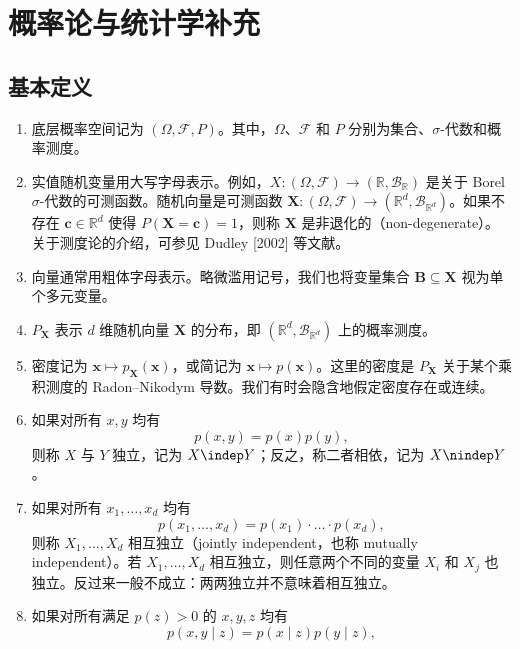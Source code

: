 \chapter{概率论与统计学补充}
\label{app:probability}
\section{基本定义}
\begin{enumerate}[label=(\roman*),leftmargin=2.7em]
\item 底层概率空间记为 $(\Omega,\mathcal F,P)$。其中，$\Omega$、$\mathcal F$ 和 $P$ 分别为集合、$\sigma$-代数和概率测度。
\item 实值随机变量用大写字母表示。例如，$X\colon(\Omega,\mathcal F)\to(\mathbb R,\mathcal B_{\mathbb R})$ 是关于 Borel $\sigma$-代数的可测函数。随机向量是可测函数 $\mathbf X\colon(\Omega,\mathcal F)\to(\mathbb R^d,\mathcal B_{\mathbb R^d})$。如果不存在 $\mathbf c\in\mathbb R^d$ 使得 $P(\mathbf X=\mathbf c)=1$，则称 $\mathbf X$ 是非退化的（non-degenerate）。关于测度论的介绍，可参见 Dudley [2002] 等文献。
\item 向量通常用粗体字母表示。略微滥用记号，我们也将变量集合 $\mathbf B\subseteq\mathbf X$ 视为单个多元变量。
\item $P_{\mathbf X}$ 表示 $d$ 维随机向量 $\mathbf X$ 的分布，即 $(\mathbb R^d,\mathcal B_{\mathbb R^d})$ 上的概率测度。
\item 密度记为 $\mathbf x\mapsto p_{\mathbf X}(\mathbf x)$，或简记为 $\mathbf x\mapsto p(\mathbf x)$。这里的密度是 $P_{\mathbf X}$ 关于某个乘积测度的 Radon--Nikodym 导数。我们有时会隐含地假定密度存在或连续。
\item 如果对所有 $x,y$ 均有
\begin{equation}p(x,y)=p(x)p(y),\tag{A.1}\end{equation}
则称 $X$ 与 $Y$ 独立，记为 $X\indep Y$；反之，称二者相依，记为 $X\nindep Y$。
\item 如果对所有 $x_1,\ldots,x_d$ 均有
\begin{equation}p(x_1,\ldots,x_d)=p(x_1)\cdot\ldots\cdot p(x_d),\tag{A.2}\end{equation}
则称 $X_1,\ldots,X_d$ 相互独立（jointly independent，也称 mutually independent）。若 $X_1,\ldots,X_d$ 相互独立，则任意两个不同的变量 $X_i$ 和 $X_j$ 也独立。反过来一般不成立：两两独立并不意味着相互独立。
\item 如果对所有满足 $p(z)>0$ 的 $x,y,z$ 均有
\begin{equation}p(x,y\mid z)=p(x\mid z)p(y\mid z),\tag{A.3}\end{equation}

\end{enumerate}
